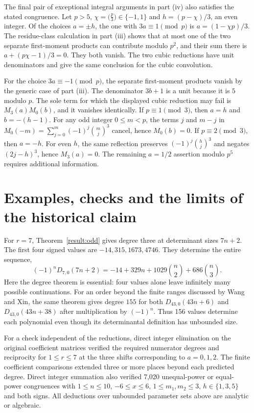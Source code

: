 \documentclass[11pt,a4paper]{article}
\theoremstyle{definition}\newtheorem{problem}[theorem]{Auxiliary problem}
\theoremstyle{remark}\newtheorem*{remark}{Remark}
\begin{document}
The final pair of exceptional integral arguments in part (iv) also satisfies
the stated congruence. Let $p>5$, $\chi=\bigl(\frac{p}{3}\bigr)\in\{-1,1\}$ and
$h=(p-\chi)/3$, an even integer. Of the choices $a=\pm h$, the one with
$3a\equiv1\pmod p$ is $a=(1-\chi p)/3$. The residue-class calculation
in part (iii) shows that at most one of the two separate first-moment
products can contribute modulo $p^2$, and their sum there is
$a+(p\chi-1)/3=0$. They both vanish. The two cubic reductions have unit
denominators and give the same conclusion for the cubic convolution.

For the choice $3a\equiv-1\pmod p$, the separate first-moment products
vanish by the generic case of part (iii). The denominator $3b+1$ is a unit
because it is $5$ modulo $p$. The sole term for which the displayed cubic
reduction may fail is $M_3(a)M_0(b)$, and it vanishes identically.
If $p\equiv1\pmod3$, then $a=h$ and $b=-(h-1)$. For any odd integer
$0\le m<p$, the terms $j$ and $m-j$ in
$M_0(-m)=\sum_{j=0}^m(-1)^j\binom{m}{j}^3$ cancel, hence $M_0(b)=0$.
If $p\equiv2\pmod3$, then $a=-h$. For even $h$, the same reflection
preserves $(-1)^j\binom hj^3$ and negates $(2j-h)^3$, hence $M_3(a)=0$.
The remaining $a=1/2$ assertion modulo $p^5$ requires additional information.


\section{Examples, checks and the limits of the historical claim}

For $r=7$, Theorem~\ref{result:odd} gives degree three at determinant sizes $7n+2$. The first four signed values are $-14,315,1673,4746$. They determine the entire sequence,
\[
 (-1)^nD_{7,0}(7n+2)
 =-14+329n+1029\binom n2+686\binom n3.
\]
Here the degree theorem is essential: four values alone leave infinitely many possible continuations. For an order beyond the finite ranges discussed by Wang and Xin, the same theorem gives degree $155$ for both $D_{43,0}(43n+6)$ and $D_{43,0}(43n+38)$ after multiplication by $(-1)^n$. Thus 156 values determine each polynomial even though its determinantal definition has unbounded size.

For a check independent of the reductions, direct integer elimination on the original coefficient matrices verified the required numerator degrees and reciprocity for $1\le r\le7$ at the three shifts corresponding to $a=0,1,2$. The finite coefficient comparisons extended three or more places beyond each predicted degree. Direct integer summation also verified 7,020 unequal-power or equal-power congruences with $1\le n\le10$, $-6\le x\le6$, $1\le m_1,m_2\le3$, $h\in\{1,3,5\}$ and both signs. All deductions over unbounded parameter sets above are analytic or algebraic.
\end{document}
